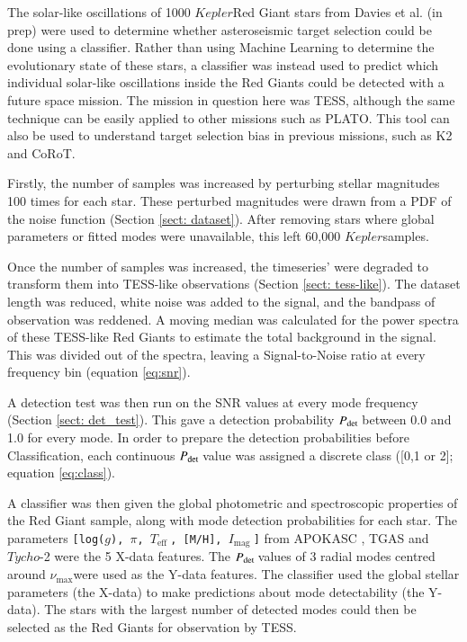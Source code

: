\documentclass[a4paper,fleqn,usenatbib,useAMS]{mnras}
\newcommand{\numax}{\ensuremath{\nu_{\textrm{max}}}}
\newcommand{\teff}{\ensuremath{T_{\textrm{eff}}\:}}
\newcommand{\kep}{\ensuremath{Kepler}\:}
\newcommand{\pdet}{\ensuremath{P_{\rm det}\:}}
\newcommand{\imag}{\ensuremath{I_{\textrm{mag}}\:}}
\begin{document}
The solar-like oscillations of 1000 \kep Red Giant stars from Davies et al. (in prep) were used to determine whether asteroseismic target selection could be done using a classifier. Rather than using Machine Learning to determine the evolutionary state of these stars, a classifier was instead used to predict which individual solar-like oscillations inside the Red Giants could be detected with a future space mission. The mission in question here was TESS, although the same technique can be easily applied to other missions such as PLATO. This tool can also be used to understand target selection bias in previous missions, such as K2 and CoRoT.


Firstly, the number of samples was increased by perturbing stellar magnitudes 100 times for each star. These perturbed magnitudes were drawn from a PDF of the noise function (Section \ref{sect: dataset}). After removing stars where global parameters or fitted modes were unavailable, this left 60,000 \kep samples. 

Once the number of samples was increased, the timeseries' were degraded to transform them into TESS-like observations (Section \ref{sect: tess-like}). The dataset length was reduced, white noise was added to the signal, and the bandpass of observation was reddened. A moving median was calculated for the power spectra of these TESS-like Red Giants to estimate the total background in the signal. This was divided out of the spectra, leaving a Signal-to-Noise ratio at every frequency bin (equation \ref{eq:snr}).

A detection test was then run on the SNR values at every mode frequency (Section \ref{sect: det_test}). This gave a detection probability \pdet between 0.0 and 1.0 for every mode. In order to prepare the detection probabilities before Classification, each continuous \pdet value was assigned a discrete class ([0,1 or 2]; equation \ref{eq:class}).

A classifier was then given the global photometric and spectroscopic properties of the Red Giant sample, along with mode detection probabilities for each star. The parameters \texttt{[log($g$), $\pi$, \teff, [M/H], \imag]} from APOKASC \citep{pinsonneault_apokasc_2014}, TGAS \citep{gaia_collaboration_gaia_2016} and $Tycho$-2 \citep{hog_tycho-2_2000} were the 5 X-data features. The \pdet values of 3 radial modes centred around \numax were used as the Y-data features. %
The classifier used the global stellar parameters (the X-data) to make predictions about mode detectability (the Y-data). The stars with the largest number of detected modes could then be selected as the Red Giants for observation by TESS. 
\end{document}
